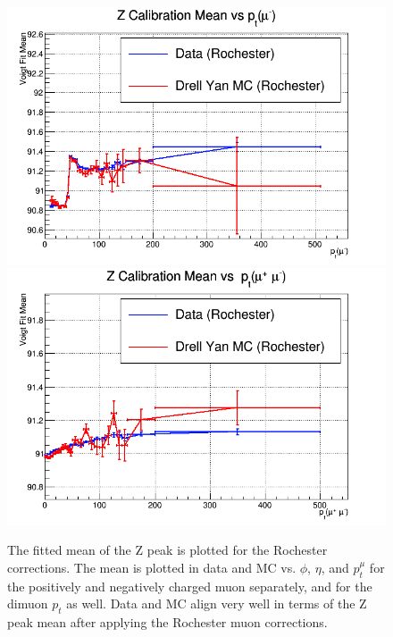 \begin{figure}[!h]
  \includegraphics[width=0.32\linewidth]{images/muon_calib/zcal_roch_mc-data_mean_pt_minus.png}
  \includegraphics[width=0.32\linewidth]{images/muon_calib/zcal_roch_mc-data_mean_dimu_pt.png}
  \caption[The Z peak mean and its alignment in data and MC after Rochester corrections.]
   {The fitted mean of the Z peak is plotted for the Rochester corrections. The mean is plotted in data and MC vs. $\phi$, $\eta$, and $p_t^\mu$ for the positively and negatively charged muon separately, and for the dimuon $p_t$ as well. Data and MC align very well in terms of the Z peak mean after applying the Rochester muon corrections.}
  \label{fig:data_mc_roch_mean_after}
\end{figure}


